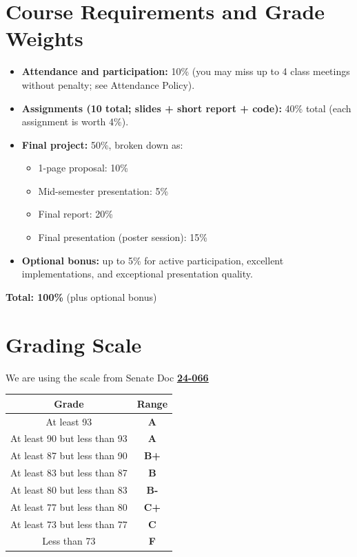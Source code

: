 \documentclass[11pt]{article}
\newcommand{\link}[2]{\href{#1}{\uline{#2}}}
\begin{document}
\section*{Course Requirements and Grade Weights}
\begin{itemize}
  \item \textbf{Attendance and participation:} 10\% (you may miss up to 4 class meetings without penalty; see Attendance Policy).
  \item \textbf{Assignments (10 total; slides + short report + code):} 40\% total (each assignment is worth 4\%).
  \item \textbf{Final project:} 50\%, broken down as:
  \begin{itemize}
    \item 1-page proposal: 10\%
    \item Mid-semester presentation: 5\%
    \item Final report: 20\%
    \item Final presentation (poster session): 15\%
  \end{itemize}
  \item \textbf{Optional bonus:} up to 5\% for active participation, excellent implementations, and exceptional presentation quality.
\end{itemize}
\textbf{Total: 100\%} (plus optional bonus)

\section*{Grading Scale}

We are using the scale from Senate Doc \link{https://www.umass.edu/senate/book/courses-policies-syllabus}{\textbf{24-066}} 

\begin{center}
\begin{tabular}{cc}
\toprule
\textbf{Grade} & \textbf{Range} \\
\midrule
At least 93 & \textbf{A} \\
At least 90 but less than 93 & \textbf{A} \\
At least 87 but less than 90 & \textbf{B+} \\
At least 83 but less than 87 & \textbf{B} \\
At least 80 but less than 83 & \textbf{B-} \\
At least 77 but less than 80 & \textbf{C+} \\
At least 73 but less than 77 & \textbf{C} \\
Less than 73 & \textbf{F} \\
\bottomrule
\end{tabular}
\end{center}
\end{document}
